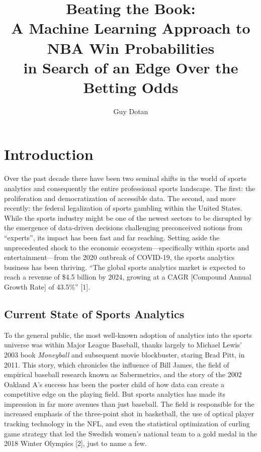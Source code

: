 \documentclass [MS] {uclathes}
\title          {Beating the Book: \\
                A Machine Learning Approach to NBA Win Probabilities \\
                in Search of an Edge Over the Betting Odds}
\author         {Guy Dotan}
\begin{document}
\makeintropages

%
%

\chapter{Introduction}

\noindent Over the past decade there have been two seminal shifts in the world of sports analytics and consequently the entire professional sports landscape. The first: the proliferation and democratization of accessible data. The second, and more recently: the federal legalization of sports gambling within the United States. \\

\noindent While the sports industry might be one of the newest sectors to be disrupted by the emergence of data-driven decisions challenging preconceived notions from ``experts'', its impact has been fast and far reaching. Setting aside the unprecedented shock to the economic ecosystem---specifically within sports and entertainment---from the 2020 outbreak of COVID-19, the sports analytics business has been thriving. ``The global sports analytics market is expected to reach a revenue of \$4.5 billion by 2024, growing at a CAGR [Compound Annual Growth Rate] of 43.5\%'' [1]. \\

\section{Current State of Sports Analytics}
\noindent To the general public, the most well-known adoption of analytics into the sports universe was within Major League Baseball, thanks largely to Michael Lewis' 2003 book \emph{Moneyball} and subsequent movie blockbuster, staring Brad Pitt, in 2011. This story, which chronicles the influence of Bill James, the field of empirical baseball research known as Sabermetrics, and the story of the 2002 Oakland A's success has been the poster child of how data can create a competitive edge on the playing field. But sports analytics has made its impression in far more avenues than just baseball. The field is responsible for the increased emphasis of the three-point shot in basketball, the use of optical player tracking technology in the NFL, and even the statistical optimization of curling game strategy that led the Swedish women's national team to a gold medal in the 2018 Winter Olympics [2], just to name a few. \\
\end{document}
